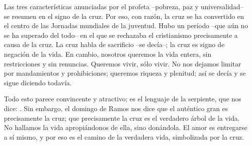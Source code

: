 \begin{body}
Las tres características anunciadas por el profeta –pobreza, paz y universalidad– se resumen en el signo de la cruz. Por eso, con razón, la cruz se ha convertido en el centro de las Jornadas mundiales de la juventud. Hubo un período –que aún no se ha superado del todo– en el que se rechazaba el cristianismo precisamente a causa de la cruz. La cruz habla de sacrificio –se decía–; la cruz es signo de negación de la vida. En cambio, nosotros queremos la vida entera, sin restricciones y sin renuncias. Queremos vivir, sólo vivir. No nos dejamos limitar por mandamientos y prohibiciones; queremos riqueza y plenitud; así se decía y se sigue diciendo todavía.

Todo esto parece convincente y atractivo; es el lenguaje de la serpiente, que nos dice: . Sin embargo, el domingo de Ramos nos dice que el auténtico gran  es precisamente la cruz; que precisamente la cruz es el verdadero árbol de la vida. No hallamos la vida apropiándonos de ella, sino donándola. El amor es entregarse a sí mismo, y por eso es el camino de la verdadera vida, simbolizada por la cruz. 
\end{body}

\label{b2-04-01-2006H}

